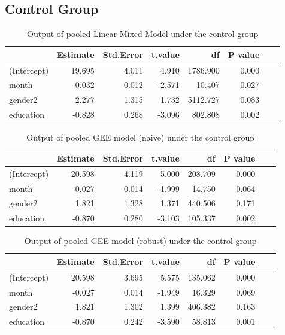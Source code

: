 \subsection{Control Group}

\begin{table}[H]
\centering
\begin{tabular}{|l|r|r|r|r|r|r|r|}
\hline
  & Estimate & Std.Error & t.value & df & P value \\
\hline
(Intercept) & 19.695 & 4.011 & 4.910 & 1786.900 & 0.000 \\
\hline
month & -0.032 & 0.012 & -2.571 & 10.407 & 0.027 \\
\hline
gender2 & 2.277 & 1.315 & 1.732 & 5112.727 & 0.083 \\
\hline
education & -0.828 & 0.268 & -3.096 & 802.808 & 0.002 \\
\hline
\end{tabular}
\caption{Output of pooled Linear Mixed Model under the control group}
\label{tab:lme.control.mi}
\end{table}

\begin{table}[H]
\centering
\begin{tabular}{|l|r|r|r|r|r|r|r|}
\hline
  & Estimate & Std.Error & t.value & df & P value \\
\hline
(Intercept) & 20.598 & 4.119 & 5.000 & 208.709 & 0.000 \\
\hline
month & -0.027 & 0.014 & -1.999 & 14.750 & 0.064 \\
\hline
gender2 & 1.821 & 1.328 & 1.371 & 440.506 & 0.171 \\
\hline
education & -0.870 & 0.280 & -3.103 & 105.337 & 0.002 \\
\hline
\end{tabular}
\caption{Output of pooled GEE model (naive) under the control group}
\label{tab:gee.control.mi.naive}
\end{table}

\begin{table}[H]
\centering
\begin{tabular}{|l|r|r|r|r|r|r|r|}
\hline
  & Estimate & Std.Error & t.value & df & P value \\
\hline
(Intercept) & 20.598 & 3.695 & 5.575 & 135.062 & 0.000 \\
\hline
month & -0.027 & 0.014 & -1.949 & 16.329 & 0.069 \\
\hline
gender2 & 1.821 & 1.302 & 1.399 & 406.382 & 0.163 \\
\hline
education & -0.870 & 0.242 & -3.590 & 58.813 & 0.001 \\
\hline
\end{tabular}
\caption{Output of pooled GEE model (robust) under the control group}
\label{tab:gee.control.mi.robust}
\end{table}

